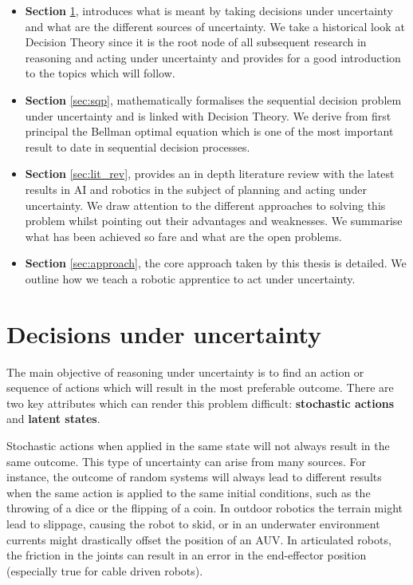 \begin{itemize}
 \item \textbf{Section} \ref{sec:deci_un}, introduces what is meant by taking decisions under uncertainty and what are the different 
 sources of uncertainty. We take a historical look at Decision Theory since it is the root node of all subsequent research in reasoning 
 and acting under uncertainty and provides for a good introduction to the topics which will follow.  
 \item \textbf{Section} \ref{sec:sqp},  mathematically formalises the sequential decision problem under uncertainty and is linked with Decision Theory. We derive from first principal 
 the Bellman optimal equation which is one of the most important result to date in sequential decision processes.
 \item \textbf{Section} \ref{sec:lit_rev}, provides an in depth literature review with the latest results in AI and robotics in the subject 
of planning and acting under uncertainty. We draw attention to the different approaches to solving this problem whilst pointing out
their advantages and weaknesses. We summarise what has been achieved so fare and what are the open problems.
 \item \textbf{Section} \ref{sec:approach}, the core approach taken by this thesis is detailed. We outline how we teach a robotic apprentice 
 to act under uncertainty.
\end{itemize}



\section{Decisions under uncertainty}\label{sec:deci_un}

The main objective of reasoning under uncertainty is to find an action or sequence of
actions which will result in the most preferable outcome. There are two key attributes which can render this 
problem difficult: \textbf{stochastic actions} and \textbf{latent states}. 

Stochastic actions when applied in the same state will not always result in the same outcome. This type of uncertainty 
can arise from many sources. For instance, the outcome of random systems will always lead to different results when the same action is applied
to the same initial conditions, such as the throwing of a dice or the flipping of a coin. In outdoor robotics the terrain might lead to slippage, causing 
the robot to skid, or in an underwater environment currents might drastically offset the position of an AUV. In articulated robots, the friction in the joints 
can result in an error in the end-effector position (especially true for cable driven robots).


